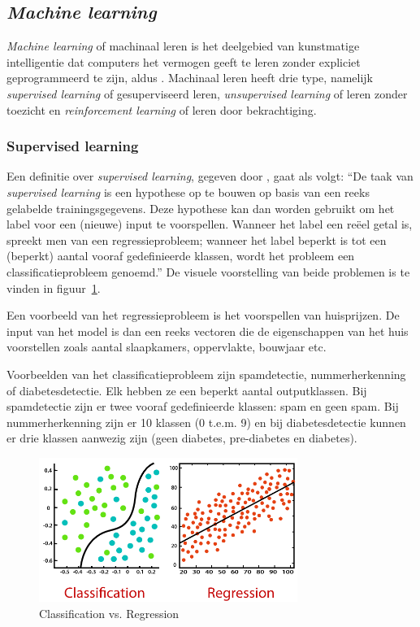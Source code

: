 {\subsection{\textit{Machine learning}}
\textit{Machine learning} of machinaal leren is het deelgebied van kunstmatige intelligentie dat computers het vermogen geeft te leren zonder expliciet geprogrammeerd te zijn, aldus \textcite{Lievens2021}. Machinaal leren heeft drie type, namelijk \textit{supervised learning} of gesuperviseerd leren, \textit{unsupervised learning} of leren zonder toezicht en \textit{reinforcement learning} of leren door bekrachtiging.

\subsubsection{Supervised learning}
Een definitie over \textit{supervised learning}, gegeven door \textcite{Lievens2021}, gaat als volgt: ``De taak van \textit{supervised learning} is een hypothese op te bouwen op basis van een reeks gelabelde trainingsgegevens. Deze hypothese kan dan worden gebruikt om het label voor een (nieuwe) input te voorspellen. Wanneer het label een reëel getal is, spreekt men van een regressieprobleem; wanneer het label beperkt is tot een (beperkt) aantal vooraf gedefinieerde klassen, wordt het probleem een classificatieprobleem genoemd.''
De visuele voorstelling van beide problemen is te vinden in figuur~\ref{fig:classification_vs_regression}.

Een voorbeeld van het regressieprobleem is het voorspellen van huisprijzen. De input van het model is dan een reeks vectoren die de eigenschappen van het huis voorstellen zoals aantal slaapkamers, oppervlakte, bouwjaar etc.

Voorbeelden van het classificatieprobleem zijn spamdetectie, nummerherkenning of diabetesdetectie. Elk hebben ze een beperkt aantal outputklassen. Bij spamdetectie zijn er twee vooraf gedefinieerde klassen: spam en geen spam. Bij nummerherkenning zijn er 10 klassen (0 t.e.m. 9) en bij diabetesdetectie kunnen er drie klassen aanwezig zijn (geen diabetes, pre-diabetes en diabetes).

\begin{figure}
    \centering
    \includegraphics[width=0.75\textwidth]{./img/classification_regression}
    \caption{\label{fig:classification_vs_regression} Classification vs. Regression~\autocite{JavaTpoint2021}}
\end{figure}

}
